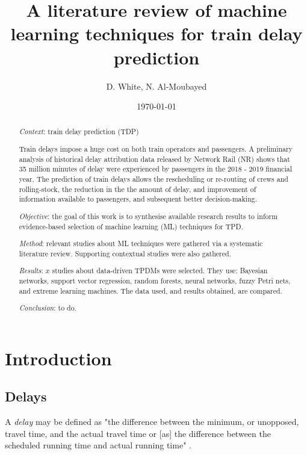 \documentclass{article}
\title{A literature review of machine learning techniques for train delay prediction}
\author{D. White, N. Al-Moubayed}
\date{\today}
\begin{document}
\begin{titlingpage}

\maketitle
\begin{abstract}

\textit{Context}: train delay prediction (TDP) 

Train delays impose a huge cost on both train operators and passengers. A preliminary analysis of historical delay attribution data released by Network Rail (NR) shows that
35 million minutes of delay were experienced by passengers in the 2018 - 2019 financial year. The prediction of train delays allows the rescheduling or re-routing of crews and rolling-stock,
the reduction in the the amount of delay, and improvement of information available to passengers, and subsequent better decision-making. 

\textit{Objective}: the goal of this work is to synthesise available research results to inform evidence-based selection of machine learning (ML) techniques for TPD.

\textit{Method}: relevant studies about ML techniques were gathered via a systematic literature review. Supporting contextual studies were also gathered.

\textit{Results}: $x$ studies about data-driven TPDMs were selected. They use: Bayesian networks, support vector regression, random forests, neural networks, fuzzy Petri nets, and extreme learning machines. 
The data used, and results obtained, are compared. 

\textit{Conclusion}: to do.

\end{abstract}
\end{titlingpage}

\tableofcontents
 
\clearpage

\twocolumn

\section{Introduction}

\subsection{Delays}

A \textit{delay} may be defined as "the difference between the minimum, or unopposed, travel time, and the actual travel time or [as] the difference between the scheduled running time and actual running time" \cite{dingler_koening_sam_christopher_2010}.
\end{document}
